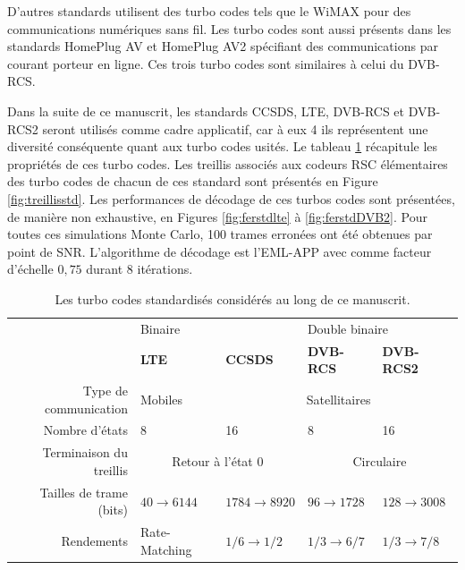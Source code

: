 D'autres standards utilisent des turbo codes tels que le WiMAX \cite{wimax} pour des  communications numériques sans fil. 
Les turbo codes sont aussi présents dans les standards HomePlug AV et HomePlug AV2 \cite{hpav} spécifiant des communications 
par courant porteur en ligne. Ces trois turbo codes sont similaires à celui du DVB-RCS.

Dans la suite de ce manuscrit, les standards CCSDS, LTE, DVB-RCS et DVB-RCS2 seront utilisés comme cadre applicatif, car 
à eux 4 ils représentent une diversité conséquente quant aux turbo codes usités. Le tableau \ref{tab:std} récapitule les 
propriétés de ces turbo codes. Les treillis associés aux codeurs RSC élémentaires des turbo codes de chacun de ces standard 
sont présentés en Figure \ref{fig:treillisstd}. Les performances de décodage de ces turbos codes sont présentées, de manière 
non exhaustive, en Figures \ref{fig:ferstdlte} à \ref{fig:ferstdDVB2}. Pour toutes ces simulations Monte Carlo, 100 trames 
erronées ont été obtenues par point de SNR. L'algorithme de décodage est l'EML-APP avec comme facteur d'échelle $0,75$ 
durant 8 itérations.

\begin{table}[b]
	\centering
	\caption{Les turbo codes standardisés considérés au long de ce manuscrit.}
	\label{tab:std}
	\begin{tabular}{@{}rllll@{}}
		\toprule
		& \multicolumn{2}{l}{Binaire} & \multicolumn{2}{l}{Double binaire} \\ 
		\cmidrule(l){2-3}\cmidrule(l){4-5}
		                        & \textbf{LTE}          & \textbf{CCSDS}          & \textbf{DVB-RCS}      & \textbf{DVB-RCS2}      \\
		\cmidrule(l){2-2}\cmidrule(l){3-3}\cmidrule(l){4-4}\cmidrule(l){5-5}
		Type de communication                  & Mobiles       &  \multicolumn{3}{c}{Satellitaires}                 \\
		\cmidrule(l){2-2}\cmidrule(l){3-5}%
		Nombre d'états         & 8                     & 16                      & 8                     & 16                     \\
		\cmidrule(l){2-2}\cmidrule(l){3-3}\cmidrule(l){4-4}\cmidrule(l){5-5}
		Terminaison du treillis    &     \multicolumn{2}{c}{Retour à l'état 0}               &                \multicolumn{2}{c}{Circulaire}                    \\
		\cmidrule(l){2-3}\cmidrule(l){4-5}
		Tailles de trame (bits) & $40 \rightarrow 6144$ & $1784 \rightarrow 8920$ & $96 \rightarrow 1728$ & $128 \rightarrow 3008$ \\
		\cmidrule(l){2-2}\cmidrule(l){3-3}\cmidrule(l){4-4}\cmidrule(l){5-5}
		Rendements              & Rate-Matching         & $1/6 \rightarrow 1/2$   & $1/3 \rightarrow 6/7$ & $1/3 \rightarrow 7/8$  \\ \bottomrule
	\end{tabular}
\end{table}

